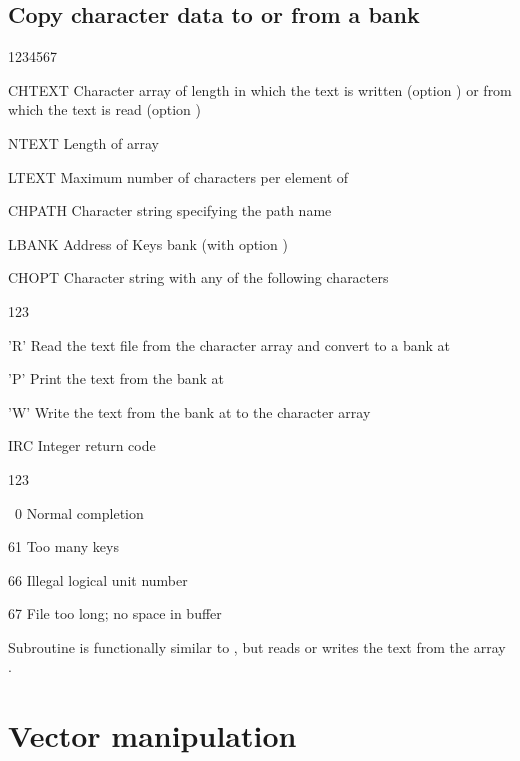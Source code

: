 \subsection{Copy character data to or from a bank}


\begin{DLtt}{1234567}
\item[CHTEXT]Character array of length  in which the text is
  written (option ) or from which the text is read (option )
\item[NTEXT]Length of array 
\item[LTEXT]Maximum number of characters per element of 
\item[CHPATH]Character string specifying the path name
\item[LBANK]Address of Keys bank  (with option )
\item[CHOPT]Character string with any of the following characters
  \begin{DLtt}{123}
    \item['R']Read the text file from the character array  
              and convert to a bank at 
    \item['P']Print the text from the bank at 
    \item['W']Write the text from the bank at  to the character array 
  \end{DLtt}
\item[IRC]Integer return code
  \begin{DLtt}{123}
    \item[\ 0]Normal completion
    \item[61]Too many keys
    \item[66]Illegal logical unit number
    \item[67]File too long; no space in buffer
  \end{DLtt}
\end{DLtt}

Subroutine  is functionally similar to ,
but reads or writes the text from the array .

\section{Vector manipulation}

